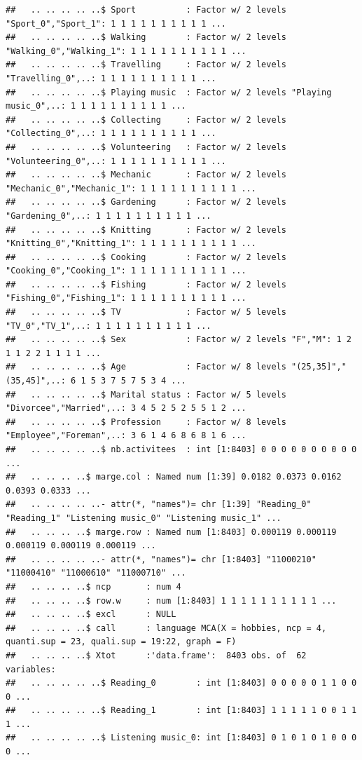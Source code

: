 \documentclass[]{book}
\begin{document}
\begin{verbatim}
##   .. .. .. .. ..$ Sport          : Factor w/ 2 levels "Sport_0","Sport_1": 1 1 1 1 1 1 1 1 1 1 ...
##   .. .. .. .. ..$ Walking        : Factor w/ 2 levels "Walking_0","Walking_1": 1 1 1 1 1 1 1 1 1 1 ...
##   .. .. .. .. ..$ Travelling     : Factor w/ 2 levels "Travelling_0",..: 1 1 1 1 1 1 1 1 1 1 ...
##   .. .. .. .. ..$ Playing music  : Factor w/ 2 levels "Playing music_0",..: 1 1 1 1 1 1 1 1 1 1 ...
##   .. .. .. .. ..$ Collecting     : Factor w/ 2 levels "Collecting_0",..: 1 1 1 1 1 1 1 1 1 1 ...
##   .. .. .. .. ..$ Volunteering   : Factor w/ 2 levels "Volunteering_0",..: 1 1 1 1 1 1 1 1 1 1 ...
##   .. .. .. .. ..$ Mechanic       : Factor w/ 2 levels "Mechanic_0","Mechanic_1": 1 1 1 1 1 1 1 1 1 1 ...
##   .. .. .. .. ..$ Gardening      : Factor w/ 2 levels "Gardening_0",..: 1 1 1 1 1 1 1 1 1 1 ...
##   .. .. .. .. ..$ Knitting       : Factor w/ 2 levels "Knitting_0","Knitting_1": 1 1 1 1 1 1 1 1 1 1 ...
##   .. .. .. .. ..$ Cooking        : Factor w/ 2 levels "Cooking_0","Cooking_1": 1 1 1 1 1 1 1 1 1 1 ...
##   .. .. .. .. ..$ Fishing        : Factor w/ 2 levels "Fishing_0","Fishing_1": 1 1 1 1 1 1 1 1 1 1 ...
##   .. .. .. .. ..$ TV             : Factor w/ 5 levels "TV_0","TV_1",..: 1 1 1 1 1 1 1 1 1 1 ...
##   .. .. .. .. ..$ Sex            : Factor w/ 2 levels "F","M": 1 2 1 1 2 2 1 1 1 1 ...
##   .. .. .. .. ..$ Age            : Factor w/ 8 levels "(25,35]","(35,45]",..: 6 1 5 3 7 5 7 5 3 4 ...
##   .. .. .. .. ..$ Marital status : Factor w/ 5 levels "Divorcee","Married",..: 3 4 5 2 5 2 5 5 1 2 ...
##   .. .. .. .. ..$ Profession     : Factor w/ 8 levels "Employee","Foreman",..: 3 6 1 4 6 8 6 8 1 6 ...
##   .. .. .. .. ..$ nb.activitees  : int [1:8403] 0 0 0 0 0 0 0 0 0 0 ...
##   .. .. .. ..$ marge.col : Named num [1:39] 0.0182 0.0373 0.0162 0.0393 0.0333 ...
##   .. .. .. .. ..- attr(*, "names")= chr [1:39] "Reading_0" "Reading_1" "Listening music_0" "Listening music_1" ...
##   .. .. .. ..$ marge.row : Named num [1:8403] 0.000119 0.000119 0.000119 0.000119 0.000119 ...
##   .. .. .. .. ..- attr(*, "names")= chr [1:8403] "11000210" "11000410" "11000610" "11000710" ...
##   .. .. .. ..$ ncp       : num 4
##   .. .. .. ..$ row.w     : num [1:8403] 1 1 1 1 1 1 1 1 1 1 ...
##   .. .. .. ..$ excl      : NULL
##   .. .. .. ..$ call      : language MCA(X = hobbies, ncp = 4, quanti.sup = 23, quali.sup = 19:22, graph = F)
##   .. .. .. ..$ Xtot      :'data.frame':  8403 obs. of  62 variables:
##   .. .. .. .. ..$ Reading_0        : int [1:8403] 0 0 0 0 0 1 1 0 0 0 ...
##   .. .. .. .. ..$ Reading_1        : int [1:8403] 1 1 1 1 1 0 0 1 1 1 ...
##   .. .. .. .. ..$ Listening music_0: int [1:8403] 0 1 0 1 0 1 0 0 0 0 ...

\end{verbatim}
\end{document}

